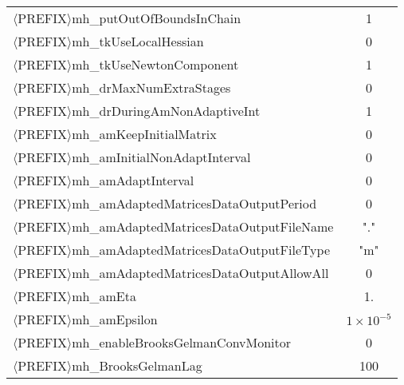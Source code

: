 \begin{table}[htpb]
\begin{center}
\begin{tabular}{l c}
 $\langle$PREFIX$\rangle$mh\_putOutOfBoundsInChain                    &  1    \\ %
 $\langle$PREFIX$\rangle$mh\_tkUseLocalHessian                        &  0    \\ %
 $\langle$PREFIX$\rangle$mh\_tkUseNewtonComponent                     &  1    \\ %
 $\langle$PREFIX$\rangle$mh\_drMaxNumExtraStages                      &  0    \\ %
 $\langle$PREFIX$\rangle$mh\_drDuringAmNonAdaptiveInt                 &  1    \\ %
 $\langle$PREFIX$\rangle$mh\_amKeepInitialMatrix                      &  0    \\ %
 $\langle$PREFIX$\rangle$mh\_amInitialNonAdaptInterval                &  0    \\ %
 $\langle$PREFIX$\rangle$mh\_amAdaptInterval                          &  0    \\ %
 $\langle$PREFIX$\rangle$mh\_amAdaptedMatricesDataOutputPeriod        &  0    \\ %
 $\langle$PREFIX$\rangle$mh\_amAdaptedMatricesDataOutputFileName      & "."   \\ %
 $\langle$PREFIX$\rangle$mh\_amAdaptedMatricesDataOutputFileType      & "m"   \\ %
 $\langle$PREFIX$\rangle$mh\_amAdaptedMatricesDataOutputAllowAll      &  0    \\ %
 $\langle$PREFIX$\rangle$mh\_amEta                                    & 1.    \\ %
 $\langle$PREFIX$\rangle$mh\_amEpsilon                                & $1\times 10^{-5}$   \\ %
 $\langle$PREFIX$\rangle$mh\_enableBrooksGelmanConvMonitor            & 0    \\ %
 $\langle$PREFIX$\rangle$mh\_BrooksGelmanLag                          & 100   \\ %
\bottomrule
\end{tabular}
\end{center}
\end{table}

